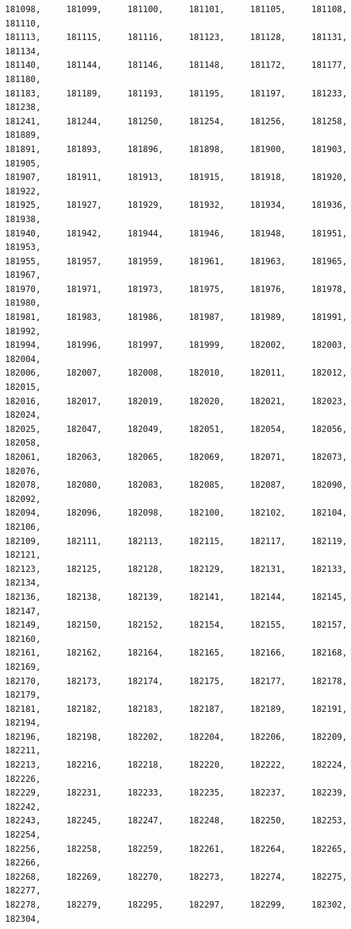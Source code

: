 \documentclass[a4paper,11pt]{report}
\begin{document}
\begin{verbatim}
181098,     181099,     181100,     181101,     181105,     181108,     181110,
181113,     181115,     181116,     181123,     181128,     181131,     181134,
181140,     181144,     181146,     181148,     181172,     181177,     181180,
181183,     181189,     181193,     181195,     181197,     181233,     181238,
181241,     181244,     181250,     181254,     181256,     181258,     181889,
181891,     181893,     181896,     181898,     181900,     181903,     181905,
181907,     181911,     181913,     181915,     181918,     181920,     181922,
181925,     181927,     181929,     181932,     181934,     181936,     181938,
181940,     181942,     181944,     181946,     181948,     181951,     181953,
181955,     181957,     181959,     181961,     181963,     181965,     181967,
181970,     181971,     181973,     181975,     181976,     181978,     181980,
181981,     181983,     181986,     181987,     181989,     181991,     181992,
181994,     181996,     181997,     181999,     182002,     182003,     182004,
182006,     182007,     182008,     182010,     182011,     182012,     182015,
182016,     182017,     182019,     182020,     182021,     182023,     182024,
182025,     182047,     182049,     182051,     182054,     182056,     182058,
182061,     182063,     182065,     182069,     182071,     182073,     182076,
182078,     182080,     182083,     182085,     182087,     182090,     182092,
182094,     182096,     182098,     182100,     182102,     182104,     182106,
182109,     182111,     182113,     182115,     182117,     182119,     182121,
182123,     182125,     182128,     182129,     182131,     182133,     182134,
182136,     182138,     182139,     182141,     182144,     182145,     182147,
182149,     182150,     182152,     182154,     182155,     182157,     182160,
182161,     182162,     182164,     182165,     182166,     182168,     182169,
182170,     182173,     182174,     182175,     182177,     182178,     182179,
182181,     182182,     182183,     182187,     182189,     182191,     182194,
182196,     182198,     182202,     182204,     182206,     182209,     182211,
182213,     182216,     182218,     182220,     182222,     182224,     182226,
182229,     182231,     182233,     182235,     182237,     182239,     182242,
182243,     182245,     182247,     182248,     182250,     182253,     182254,
182256,     182258,     182259,     182261,     182264,     182265,     182266,
182268,     182269,     182270,     182273,     182274,     182275,     182277,
182278,     182279,     182295,     182297,     182299,     182302,     182304,

\end{verbatim}
\end{document}
